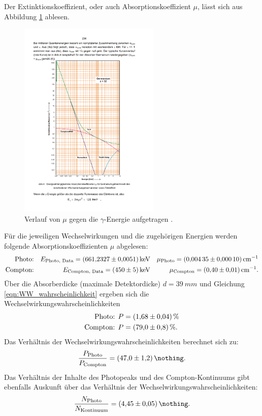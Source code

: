 Der Extinktionskoeffizient, oder auch Absorptionskoeffizient $\mu$, lässt sich aus Abbildung \ref{fig:absorptionskoeffizient} ablesen.
\begin{figure}[h!]
  \centering
  \includegraphics[width=0.6\textwidth]{content/images/V704.pdf}
  \caption{Verlauf von $\mu$ gegen die $\gamma$-Energie aufgetragen \cite{anleitungv704}.}
  \label{fig:absorptionskoeffizient}
\end{figure}
Für die jeweiligen Wechselwirkungen und die zugehörigen Energien werden folgende Absorptionskoeffizienten $\mu$ abgelesen:
\begin{align*}
	\text{Photo:}	&& E_{\text{Photo, Data}} = \SI{661.2327 (51)}{\kilo \electronvolt} && \mu_{\text{Photo}} = \SI{0.00435 (10)}{cm^{-1}} \\
	\text{Compton:}	&& E_{\text{Compton, Data}} = \SI{450 (5)}{\kilo \electronvolt} 	&& \mu_{\text{Compton}} = \SI{0.40 (1)}{cm^{-1}}. \\
\end{align*}
Über die Absorberdicke (maximale Detektordicke) $d=\SI{39}{mm}$ und Gleichung \eqref{eqn:WW_wahrscheinlichkeit} %
ergeben sich die Wechselwirkungswahrscheinlichkeiten
\begin{align*}
	\text{Photo: }		& P= \SI{1.68 (4)}{\%} \\
	\text{Compton: }	& P= \SI{79.0 (8)}{\%}. \\
\end{align*}
Das Verhältnis der Wechselwirkungswahrscheinlichkeiten berechnet sich zu:
\begin{equation*}
	\frac{ P_{\text{Photo} } }{ P_{ \text{Compton} } } = \SI{47.0 (12)}{\nothing}.
\end{equation*}
Das Verhältnis der Inhalte des Photopeaks und des Compton-Kontinuums gibt ebenfalls Auskunft über das Verhältnis der Wechselwirkungswahrscheinlichkeiten:
\begin{equation*}
	\frac{ N_{\text{Photo}} }{ N_{\text{Kontinuum}} } = \SI{4.45 (5)}{\nothing}.
\end{equation*}

